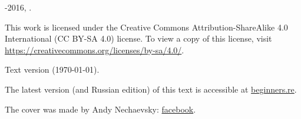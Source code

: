 ﻿\begin{titlepage}


\end{titlepage}

\newpage

\begin{center}
\vspace*{\fill}
{\LARGE \TITLE}

\vspace*{\fill}

{\large \AUTHOR}

{\large \TT{<\EMAIL>}}
\vspace*{\fill}
\vfill

\ccbysa

-2016, \AUTHOR. 

This work is licensed under the Creative Commons Attribution-ShareAlike 4.0 International (CC BY-SA 4.0) license.
To view a copy of this license, visit \url{https://creativecommons.org/licenses/by-sa/4.0/}.

Text version ({\large \today}).

The latest version (and Russian edition) of this text is accessible at \href{http://go.yurichev.com/17009}{beginners.re}.

The cover was made by Andy Nechaevsky: \href{http://go.yurichev.com/17023}{facebook}.

\end{center}
